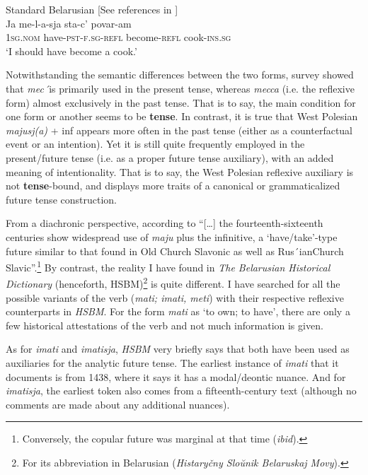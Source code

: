 \documentclass[output=paper,colorlinks,citecolor=brown]{langscibook}
\begin{document}
\ea \label{ex:roncero:18}
    Standard Belarusian [See references in \citet[181]{Mazzitelli2011}]\\
    \gll Ja me-l-a-sja sta-c’ povar-am\\
    1\textsc{sg.nom} have-\textsc{pst-f.sg-refl} become-\textsc{refl} cook-\textsc{ins.sg}\\
    \glt ‘I should have become a cook.’
\z

Notwithstanding the semantic differences between the two forms,  survey showed that \textit{mec´}is primarily used in the present tense, whereas \textit{mecca} (i.e. the reflexive form) almost exclusively in the past tense. That is to say, the main condition for one form or another seems to be \textbf{tense}. In contrast, it is true that West Polesian \textit{majusj(a)} + inf appears more often in the past tense (either as a counterfactual event or an intention). Yet it is still quite frequently employed in the present/future tense (i.e. as a proper future tense auxiliary), with an added meaning of intentionality. That is to say, the West Polesian reflexive auxiliary is not \textbf{tense}-bound, and displays more traits of a canonical or grammaticalized future tense construction.

 From a diachronic perspective, according to \citet[54]{Whaley2000} “[…] the fourteenth\hyp{}sixteenth centuries show widespread use of \textit{maju }plus the infinitive, a ‘have/take’-type future similar to that found in Old Church Slavonic as well as Rus´ianChurch Slavic”.\footnote{Conversely, the copular future was marginal at that time (\textit{ibid}).} By contrast, the reality I have found in \textit{The Belarusian Historical Dictionary} (henceforth, HSBM)\footnote{For its abbreviation in Belarusian (\textit{Histaryčny Sloŭnik Belaruskaj Movy}).} is quite different. I have searched for all the possible variants of the verb (\textit{mati; imati, meti}) with their respective reflexive counterparts in \textit{HSBM}. For the form \textit{mati} as ‘to own; to have’, there are only a few historical attestations of the verb and not much information is given. 

As for \textit{imati} and \textit{imatisja}, \textit{HSBM }very briefly says that both have been used as auxiliaries for the analytic future tense. The earliest instance of \textit{imati} that it documents is from 1438, where it says it has a modal/deontic nuance. And for \textit{imatisja}, the earliest token also comes from a fifteenth-century text (although no comments are made about any additional nuances).
\end{document}
